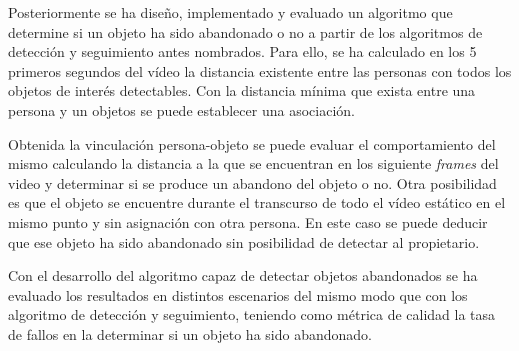 Posteriormente se ha diseño, implementado y evaluado un algoritmo que determine si un objeto ha sido abandonado o no a partir de los algoritmos de detección y seguimiento antes nombrados. Para ello, se ha calculado en los 5 primeros segundos del vídeo la distancia existente entre las personas con todos los objetos de interés detectables. Con la distancia mínima que exista entre una persona y un objetos se puede establecer una asociación.

Obtenida la vinculación persona-objeto se puede evaluar el comportamiento del mismo calculando la distancia a la que se encuentran en los siguiente \textit{frames} del video y determinar si se produce un abandono del objeto o no. Otra posibilidad es que el objeto se encuentre durante el transcurso de todo el vídeo estático \cite{article} en el mismo punto y sin asignación con otra persona. En este caso se puede deducir que ese objeto ha sido abandonado sin posibilidad de detectar al propietario.

Con el desarrollo del algoritmo capaz de detectar objetos abandonados se ha evaluado los resultados en distintos escenarios del mismo modo que con los algoritmo de detección y seguimiento, teniendo como métrica de calidad la tasa de fallos en la determinar si un objeto ha sido abandonado.
